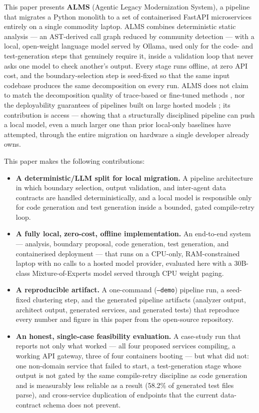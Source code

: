 \documentclass[conference]{IEEEtran}
\begin{document}
This paper presents \textbf{ALMS} (Agentic Legacy Modernization System), a pipeline that migrates a Python monolith to a set of containerised FastAPI microservices entirely on a single commodity laptop. ALMS combines deterministic static analysis --- an AST-derived call graph reduced by community detection --- with a local, open-weight language model served by Ollama, used only for the code- and test-generation steps that genuinely require it, inside a validation loop that never asks one model to check another's output. Every stage runs offline, at zero API cost, and the boundary-selection step is seed-fixed so that the same input codebase produces the same decomposition on every run. ALMS does not claim to match the decomposition quality of trace-based or fine-tuned methods \cite{sellami2025,kalia2021}, nor the deployability guarantees of pipelines built on large hosted models \cite{chen2026}; its contribution is access --- showing that a structurally disciplined pipeline can push a local model, even a much larger one than prior local-only baselines have attempted, through the entire migration on hardware a single developer already owns.

This paper makes the following contributions:
\begin{itemize}
\item \textbf{A deterministic/LLM split for local migration.} A pipeline architecture in which boundary selection, output validation, and inter-agent data contracts are handled deterministically, and a local model is responsible only for code generation and test generation inside a bounded, gated compile-retry loop.
\item \textbf{A fully local, zero-cost, offline implementation.} An end-to-end system --- analysis, boundary proposal, code generation, test generation, and containerised deployment --- that runs on a CPU-only, RAM-constrained laptop with no calls to a hosted model provider, evaluated here with a 30B-class Mixture-of-Experts model served through CPU weight paging.
\item \textbf{A reproducible artifact.} A one-command (\texttt{--demo}) pipeline run, a seed-fixed clustering step, and the generated pipeline artifacts (analyzer output, architect output, generated services, and generated tests) that reproduce every number and figure in this paper from the open-source repository.
\item \textbf{An honest, single-case feasibility evaluation.} A case-study run that reports not only what worked --- all four proposed services compiling, a working API gateway, three of four containers booting --- but what did not: one non-domain service that failed to start, a test-generation stage whose output is not gated by the same compile-retry discipline as code generation and is measurably less reliable as a result (58.2\% of generated test files parse), and cross-service duplication of endpoints that the current data-contract schema does not prevent.
\end{itemize}
\end{document}
